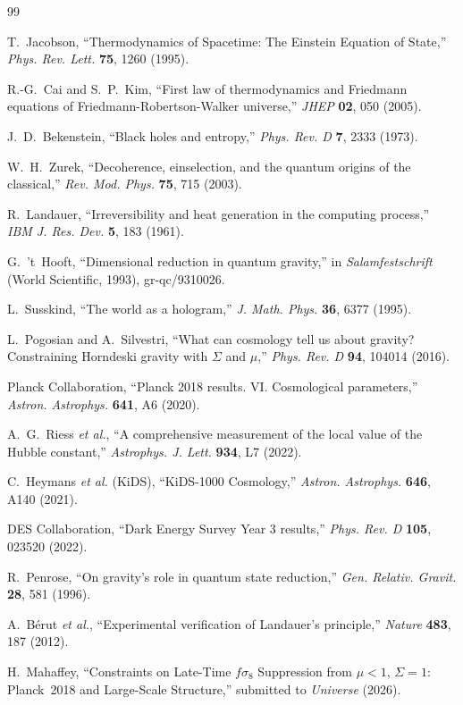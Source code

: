 \documentclass[12pt]{article}
\begin{document}
\begin{thebibliography}{99}

T.~Jacobson, ``Thermodynamics of Spacetime: The Einstein Equation of
State,'' \textit{Phys. Rev. Lett.} \textbf{75}, 1260 (1995).

R.-G.~Cai and S.~P.~Kim, ``First law of thermodynamics and Friedmann
equations of Friedmann-Robertson-Walker universe,'' \textit{JHEP}
\textbf{02}, 050 (2005).

J.~D.~Bekenstein, ``Black holes and entropy,'' \textit{Phys. Rev. D}
\textbf{7}, 2333 (1973).

W.~H.~Zurek, ``Decoherence, einselection, and the quantum origins of the
classical,'' \textit{Rev. Mod. Phys.} \textbf{75}, 715 (2003).

R.~Landauer, ``Irreversibility and heat generation in the computing
process,'' \textit{IBM J. Res. Dev.} \textbf{5}, 183 (1961).

G.~'t~Hooft, ``Dimensional reduction in quantum gravity,'' in
\textit{Salamfestschrift} (World Scientific, 1993), gr-qc/9310026.

L.~Susskind, ``The world as a hologram,'' \textit{J. Math. Phys.}
\textbf{36}, 6377 (1995).

L.~Pogosian and A.~Silvestri, ``What can cosmology tell us about gravity?
Constraining Horndeski gravity with $\Sigma$ and $\mu$,'' \textit{Phys.
Rev. D} \textbf{94}, 104014 (2016).

Planck Collaboration, ``Planck 2018 results. VI. Cosmological parameters,''
\textit{Astron. Astrophys.} \textbf{641}, A6 (2020).

A.~G.~Riess \textit{et al.}, ``A comprehensive measurement of the local
value of the Hubble constant,'' \textit{Astrophys. J. Lett.} \textbf{934},
L7 (2022).

C.~Heymans \textit{et al.} (KiDS), ``KiDS-1000 Cosmology,''
\textit{Astron. Astrophys.} \textbf{646}, A140 (2021).

DES Collaboration, ``Dark Energy Survey Year 3 results,'' \textit{Phys.
Rev. D} \textbf{105}, 023520 (2022).

R.~Penrose, ``On gravity's role in quantum state reduction,''
\textit{Gen. Relativ. Gravit.} \textbf{28}, 581 (1996).

A.~B\'erut \textit{et al.}, ``Experimental verification of Landauer's
principle,'' \textit{Nature} \textbf{483}, 187 (2012).

H.~Mahaffey, ``Constraints on Late-Time $f\sigma_8$ Suppression from
$\mu < 1$, $\Sigma = 1$: Planck~2018 and Large-Scale Structure,''
submitted to \textit{Universe} (2026).

\end{thebibliography}
\end{document}

